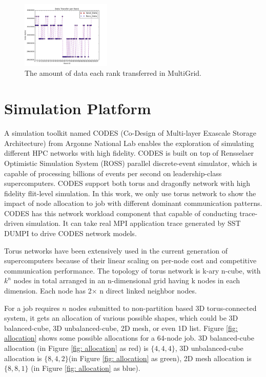 \documentclass[conference]{IEEEtran}
\begin{document}
\begin{figure}[h!] 
  \centering
  \includegraphics[width=0.38\textwidth]{figs/mg/mg_data_transfer}
   \caption{The amount of data each rank transferred in MultiGrid. }
   \label{fig: cr data trans}
\end{figure}


\section{Simulation Platform}
\label{sec:simulation}

A simulation toolkit named CODES (Co-Design of Multi-layer Exascale Storage Architecture) from Argonne National Lab enables the exploration of simulating different HPC networks with high fidelity\cite{Jason-2011}\cite{mubarak-sc2012}. CODES is built on top of Rensselaer Optimistic Simulation System (ROSS) parallel discrete-event simulator, which is capable of processing billions of events per second on leadership-class supercomputers\cite{ross}. CODES support both torus and dragonfly network with high fidelity flit-level simulation. In this work, we only use torus network to show the impact of node allocation to job with different dominant communication patterns. CODES has this network workload component that capable of conducting trace-driven simulation. It can take real MPI application trace generated by SST DUMPI\cite{sst} to drive CODES network models. 


Torus networks have been extensively used in the current generation of supercomputers because of their linear scaling on per-node cost and competitive communication performance. The topology of torus network is k-ary n-cube, with $k^n$ nodes in total arranged in an n-dimensional grid having k nodes in each dimension. Each node has 2$\times$ n direct linked neighbor nodes. 

For a job requires $n$ nodes submitted to non-partition based 3D torus-connected system, it gets an allocation of various possible shapes, which could be 3D balanced-cube, 3D unbalanced-cube, 2D mesh, or even 1D list. Figure \ref{fig: allocation} shows some possible allocations for a 64-node job. 3D balanced-cube allocation (in Figure \ref{fig: allocation} as red) is $\{4,4,4\}$, 3D unbalanced-cube allocation is $\{8,4,2\}$(in Figure \ref{fig: allocation} as green), 2D mesh allocation is $\{8,8,1\}$ (in Figure \ref{fig: allocation} as blue).
\end{document}
